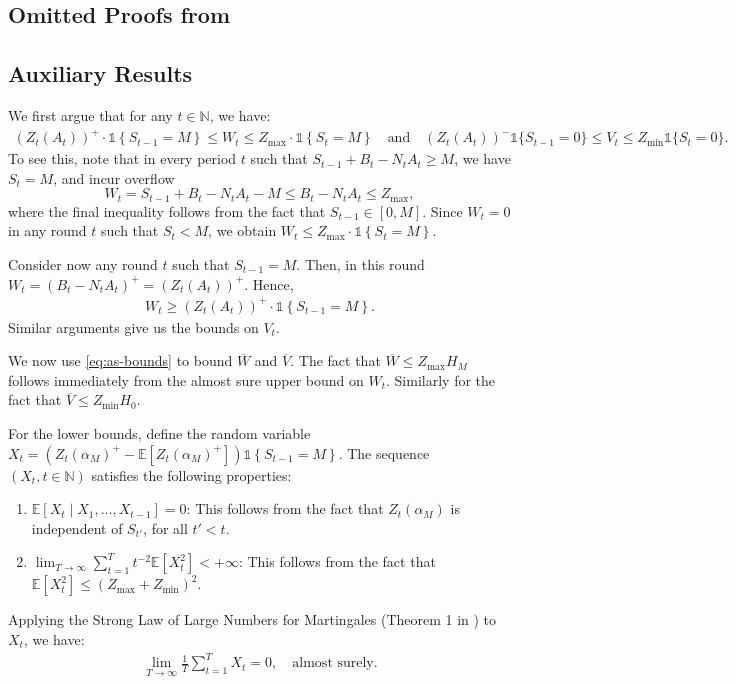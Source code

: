 \documentclass[mnsc,nonblindrev]{informs3}
\newcommand{\ind}[1]{\mathds{1}\left\{#1\right\}}
\newcommand{\Exp}[1]{\mathbb{E} \left[ #1 \right]} %
\newcommand{\Ind}[1]{\mathds{1}\left\{ #1 \right\}}
\renewenvironment{proof}[1][Proof]{%
  \par\noindent{\itshape #1.} \ignorespaces
}{%
  \hfill\Halmos\par
}
\begin{document}
\begin{APPENDICES}
\section{Omitted Proofs from }\label{apx:4.1-proof}


\subsection{Auxiliary Results}\label{apx:aux-res}

\MainCorr*

\begin{proof}
We first argue that for any $t \in \mathbb{N}$, we have:
\begin{align}\label{eq:as-bounds}
(Z_t(A_t))^+ \cdot \ind{S_{t-1} = M} \leq W_t \leq   Z_{\max} \cdot \ind{S_t = M} \quad \text{and} \quad
(Z_t(A_t))^-\mathds{1}\{S_{t-1} = 0\} \leq V_t \leq Z_{\min}\mathds{1}\{S_t = 0\}.
\end{align}
To see this, note that in every period $t$ such that $S_{t-1} + B_{t} - N_t A_t \geq M$, we have $S_t = M$, and incur overflow
\[W_t = S_{t-1} + B_{t} - N_t A_t - M \leq B_t-N_t A_t \leq Z_{\max},\] where the final inequality follows from the fact that $S_{t-1} \in [0,M]$.
Since $W_t = 0$ in any round $t$ such that $S_t < M$, we obtain $W_t \leq Z_{\max} \cdot \ind{S_t = M}.$ 

Consider now any round $t$ such that $S_{t-1} = M$. Then, in this round \mbox{$W_t = (B_{t} - N_t A_t)^+ = (Z_t(A_t))^+$}. Hence, 
\begin{align}\label{eq:wt-as-lb}
W_t \geq (Z_t(A_t))^+ \cdot \ind{S_{t-1} = M}.
\end{align}
Similar arguments give us the bounds on $V_t$.

\smallskip 

We now use \eqref{eq:as-bounds} to bound $\overline{W}$ and $\overline{V}$. The fact that $\overline{W} \leq Z_{\max} H_M$ follows immediately from the almost sure upper bound on $W_t$. Similarly for the fact that $\overline{V} \leq Z_{\min} H_0$.

For the lower bounds, define the random variable $X_t = \left(Z_t(\alpha_M)^+ - \Exp{Z_t(\alpha_M)^+}\right) \Ind{S_{t-1} = M}.$ 
The sequence $(X_t, t \in \mathbb{N})$ satisfies the following properties:
\begin{enumerate}
\item $\mathbb{E}[X_t \mid X_1,\ldots, X_{t-1}] = 0$: This follows from the fact that $Z_t(\alpha_M)$ is independent of $S_{t'}$, for all $t' < t$.
\item $\lim_{T\to\infty}\sum_{t=1}^Tt^{-2}\mathbb{E}[X_t^2] < +\infty$: This follows from the fact that $\mathbb{E}[X_t^2]\leq {(Z_{\max}+Z_{\min})^2}$. 
\end{enumerate}
Applying the Strong Law of Large Numbers for Martingales (Theorem 1 in \citet{csorgHo1968strong}) to $X_t$, we have:
\begin{align*}
\lim_{T\to\infty}\frac1T\sum_{t=1}^TX_t = 0, \quad \text{almost surely}.
\end{align*}


\end{proof}
\end{APPENDICES}
\end{document}
